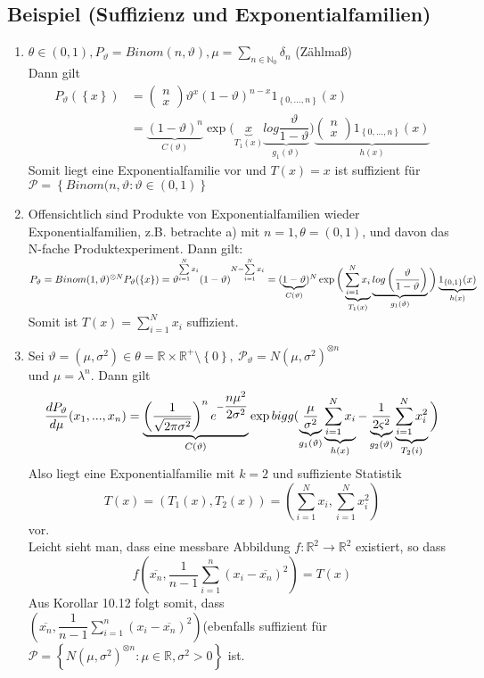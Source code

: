 \documentclass[german,10pt,oneside, fleqn, a4paper]{article}
\newcommand {\R}	{\mathbb{R}}
\newcommand {\N}	{\mathbb{N}}
\newcommand{\ra}{\rightarrow}
\newcommand{\sm}[2][\infty]{\sum\limits_{#2}^{#1}}
\newcommand{\brc}[1]{\left(#1\right)}
\newcommand{\brac}[1]{\left\lbrace #1\right\rbrace}
\newcommand{\mat}[1]{\begin{pmatrix}#1\end{pmatrix}}
\newcommand{\mc}[1]{\mathcal{#1}}
\newcommand{\1}[1]{1_{#1}}
\newcommand{\2}[1]{\1{\brac{#1}}}
\newcommand{\p}{\mc{P}}
\newcommand{\stuff}{{\otimes n}}
\begin{document}
\subsection{Beispiel (Suffizienz und Exponentialfamilien)}
\label{10.15}
\begin{enumerate}[label=(\alph*)]
\item $\theta\in(0,1), P_\vartheta=Binom(n,\vartheta), \mu=\sm[]{n\in\N_0}\delta_n$ (Zählmaß)\\
Dann gilt
\begin{align}
P_\vartheta(\brac{x}) & = \mat{n\\x}\vartheta^x(1-\vartheta)^{n-x}1_{\brac{0,...,n}}(x)\\
& = \underbrace{(1-\vartheta) ^n}_{C(\vartheta)}\exp\bigg(\underbrace{x}_{T_1(x)}\underbrace{log\dfrac{\vartheta}{1-\vartheta}}_{g_1(\vartheta)}\bigg)\underbrace{\mat{n\\x}1_{\brac{0,...,n}}(x)}_{h(x)}
\end{align}
Somit liegt eine Exponentialfamilie vor und $T(x)=x$ ist suffizient für $\p=\brac{Binom(n,\vartheta:\vartheta\in(0,1)}$
\item Offensichtlich sind Produkte von Exponentialfamilien wieder\\ Exponentialfamilien, z.B. betrachte a) mit $n=1, \theta=(0,1)$, und davon das N-fache Produktexperiment. Dann gilt: $P_\vartheta=Binom(1,\vartheta)^{\otimes N}\\
P_\vartheta(\brac{x})=\vartheta^{\sm[N]{i=1}x_i}(1-\vartheta)^{N-\sm[N]{i=1}x_i}\\
=(\underbrace{1-\vartheta}_{C(\vartheta)})^N\exp\bigg(\underbrace{\sm[N]{i=1}x_i}_{T_1(x)}\underbrace{log\brc{\dfrac{\vartheta}{1-\vartheta}}}_{g_1(\vartheta)}\bigg)\underbrace{1_{\brac{0,1}}(x)}_{h(x)}$\\
Somit ist $T(x)=\sm[N]{i=1}x_i$ suffizient.
\item Sei $\vartheta=(\mu,\sigma^2)\in\theta=\R\times\R^+\setminus\brac{0},\ \p_\vartheta=N(\mu,\sigma^2)^\stuff$\\
und $\mu=\lambda^n$. Dann gilt \[
\dfrac{dP_\vartheta}{d\mu}(x_1,...,x_n)=\underbrace{\brc{\dfrac{1}{\sqrt{2\pi\sigma^2}}}^ne^{-\dfrac{n\mu^2}{2\sigma^2}}}_{C(\vartheta)}\exp\\bigg(\underbrace{\dfrac{\mu}{\sigma^2}}_{g_1(\vartheta)}\underbrace{\sm[N]{i=1}x_i}_{h(x)}-\underbrace{\dfrac{1}{2\varsigma^2}}_{g_2(\vartheta)}\underbrace{\sm[N]{i=1}x_i^2}_{T_2(i)}\bigg)
\]
Also liegt eine Exponentialfamilie mit $k=2$ und suffiziente Statistik\[
T(x)=(T_1(x),T_2(x))=\brc{\sm[N]{i=1}x_i,\sm[N]{i=1}x_i^2}\]
vor.
 \\
Leicht sieht man, dass eine messbare Abbildung $f:\R^2\ra\R^2$ existiert, so dass 
\[f\brc{\overline{x_n},\dfrac{1}{n-1}\sm[n]{i=1}(x_i-\overline{x_n})^2}=T(x)\] 
Aus Korollar 10.12 folgt somit, dass \\
$\brc{\overline{x_n},\dfrac{1}{n-1}\sm[n]{i=1}(x_i-\overline{x_n})^2}$(ebenfalls  suffizient für $\mc{P}=\brac{N(\mu,\sigma^2)^\stuff:\mu\in\R,\sigma^2>0}$ ist.
\end{enumerate}
\end{document}

